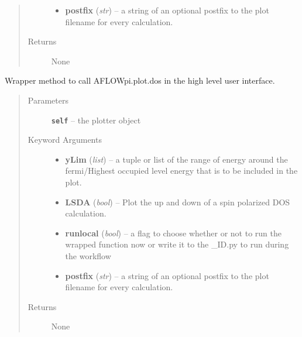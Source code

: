 \documentclass[letterpaper,10pt,english]{sphinxmanual}
\begin{document}
\begin{fulllineitems}
\begin{fulllineitems}
\begin{quote}
\begin{description}
\begin{itemize}
\item {} 
\textbf{postfix} (\emph{str}) --
a string of an optional postfix to the plot filename for every
calculation.

\end{itemize}

\item[{Returns}] \leavevmode
None

\end{description}\end{quote}

\end{fulllineitems}


\begin{fulllineitems}
\label{prep:prep.plotter.dos}
Wrapper method to call AFLOWpi.plot.dos in the high level user interface.
\begin{quote}\begin{description}
\item[{Parameters}] \leavevmode
\textbf{\texttt{self}} -- the plotter object

\item[{Keyword Arguments}] \leavevmode\begin{itemize}
\item {} 
\textbf{yLim} (\emph{list}) --
a tuple or list of the range of energy around the fermi/Highest
occupied level energy that is to be included in the plot.

\item {} 
\textbf{LSDA} (\emph{bool}) --
Plot the up and down of a spin polarized DOS
calculation.

\item {} 
\textbf{runlocal} (\emph{bool}) --
a flag to choose whether or not to run the wrapped function now
or write it to the \_ID.py to run during the workflow

\item {} 
\textbf{postfix} (\emph{str}) --
a string of an optional postfix to the plot filename for every
calculation.

\end{itemize}

\item[{Returns}] \leavevmode
None

\end{description}\end{quote}


\end{fulllineitems}
\end{fulllineitems}
\end{document}
